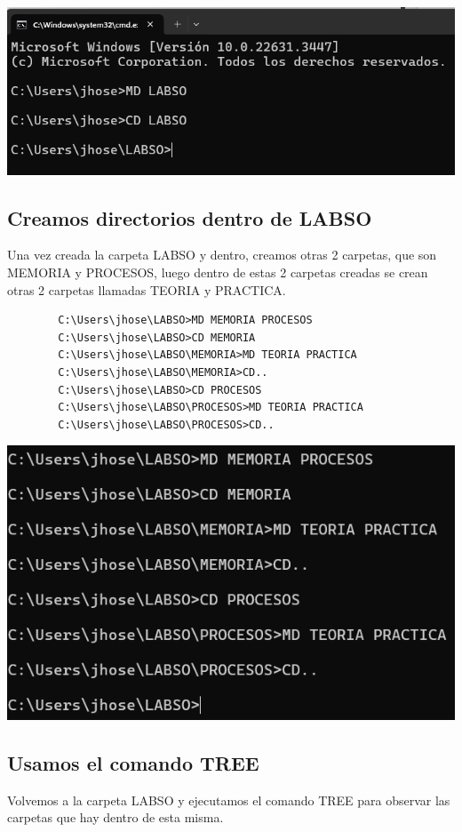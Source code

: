 \documentclass{article}
\begin{document}
        \includegraphics[scale=0.8]{WindowsCapturas/CreacionLABSO.png}  

    \subsection{Creamos directorios dentro de LABSO}
        Una vez creada la carpeta LABSO y dentro, creamos otras 2 carpetas, que son MEMORIA y PROCESOS, luego dentro de estas 2 carpetas creadas se crean otras 2 carpetas llamadas TEORIA y PRACTICA.
        \begin{verbatim}
        C:\Users\jhose\LABSO>MD MEMORIA PROCESOS
        C:\Users\jhose\LABSO>CD MEMORIA
        C:\Users\jhose\LABSO\MEMORIA>MD TEORIA PRACTICA
        C:\Users\jhose\LABSO\MEMORIA>CD..
        C:\Users\jhose\LABSO>CD PROCESOS
        C:\Users\jhose\LABSO\PROCESOS>MD TEORIA PRACTICA
        C:\Users\jhose\LABSO\PROCESOS>CD..
        \end{verbatim}
        
        \includegraphics[scale=0.8]{WindowsCapturas/Carpetas.png}  

    \subsection{Usamos el comando TREE}
        Volvemos a la carpeta LABSO y ejecutamos el comando TREE para observar las carpetas que hay dentro de esta misma.
    
\end{document}
